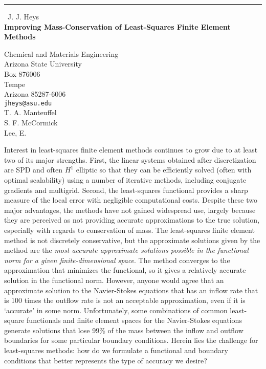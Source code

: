 \documentclass{report}
\begin{document}
\begin{center}
\rule{6in}{1pt} \
{\large J. J. Heys \\
{\bf Improving Mass-Conservation of Least-Squares Finite Element Methods}}

Chemical and Materials Engineering \\ Arizona State University \\ Box 876006 \\ Tempe \\ Arizona 85287-6006
\\
{\tt jheys@asu.edu}\\
T. A. Manteuffel\\
S. F. McCormick\\
	Lee, E.\end{center}

Interest in least-squares finite element methods continues to grow due to
at least two of its major strengths. First, the linear systems obtained
after discretization are SPD and often $H^1$ elliptic so that they can be
efficiently solved (often with optimal scalability) using a number of
iterative methods, including conjugate gradients and multigrid. Second,
the least-squares functional provides a sharp measure of the local error
with negligible computational costs. Despite these two major advantages,
the methods have not gained widespread use, largely because they are
perceived as not providing accurate approximations to the true solution,
especially with regards to conservation of mass. The least-squares finite
element method is not discretely conservative, but the approximate
solutions given by the method are the \emph{most accurate approximate
solutions possible in the functional norm for a given finite-dimensional
space}. The method converges to the approximation that minimizes the
functional, so it gives a relatively accurate solution in the functional
norm. However, anyone would agree that an approximate solution to the
Navier-Stokes equations that has an inflow rate that is 100 times the
outflow rate is not an acceptable approximation, even if it is `accurate'
in some norm. Unfortunately, some combinations of common least-square
functionals and finite element spaces for the Navier-Stokes equations
generate solutions that lose 99\% of the mass between the inflow and
outflow boundaries for some particular boundary conditions. Herein lies
the challenge for least-squares methods: how do we formulate a functional
and boundary conditions that better represents the type of accuracy we
desire?
\end{document}
